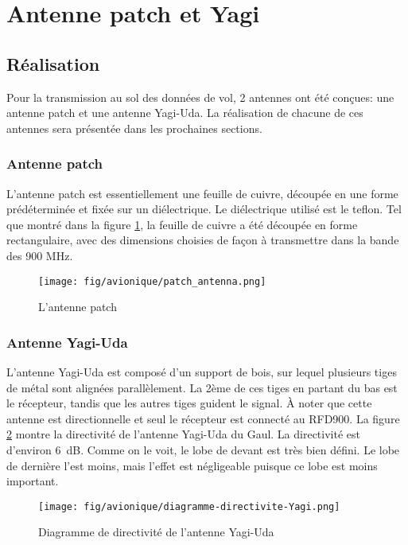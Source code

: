 \section{Antenne patch et Yagi}
\label{chap:antennes}

\subsection{Réalisation}

Pour la transmission au sol des données de vol, 2 antennes ont été conçues: une
antenne patch et une antenne Yagi-Uda. La réalisation de chacune de ces
antennes sera présentée dans les prochaines sections.

\subsubsection{Antenne patch}

L'antenne patch est essentiellement une feuille de cuivre, découpée en une
forme prédéterminée et fixée sur un diélectrique. Le diélectrique utilisé est
le teflon. Tel que montré dans la figure \ref{f:antenne_patch}, la feuille de
cuivre a été découpée en forme rectangulaire, avec des dimensions choisies de
façon à transmettre dans la bande des 900 MHz.

\begin{figure}[H]
	\center
	\texttt{[image: fig/avionique/patch\_antenna.png]}
	\caption{L'antenne patch}
	\label{f:antenne_patch}
\end{figure}

\subsubsection{Antenne Yagi-Uda}

L'antenne Yagi-Uda est composé d'un support de bois, sur lequel plusieurs tiges
de métal sont alignées parallèlement. La 2ème de ces tiges en partant du bas
est le récepteur, tandis que les autres tiges guident le signal. À noter que
cette antenne est directionnelle et seul le récepteur est connecté au RFD900.
La figure \ref{f:diagramme_directivite_yagi} montre la directivité de l'antenne
Yagi-Uda du Gaul. La directivité est d'environ 6~dB. Comme on le voit, le lobe
de devant est très bien défini. Le lobe de dernière l'est moins, mais l'effet
est négligeable puisque ce lobe est moins important.

\begin{figure}[H]
	\center
	\texttt{[image: fig/avionique/diagramme-directivite-Yagi.png]}
	\caption{Diagramme de directivité de l'antenne Yagi-Uda}
	\label{f:diagramme_directivite_yagi}
\end{figure}

